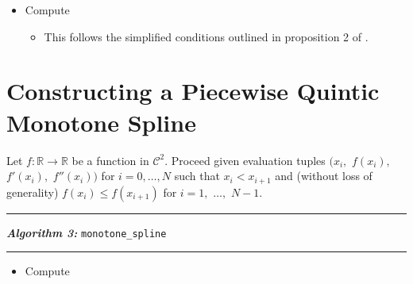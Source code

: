 \documentclass{article}
\begin{document}
\begin{itemize}
  \itemsep0pt
  \parskip0pt

\item Compute

  \begin{itemize}
    \item[] This follows the simplified conditions outlined in proposition 2 of \cite{schmidt1988positivity}.
  \end{itemize}

\end{itemize}


\section{Constructing a Piecewise Quintic Monotone Spline}
\label{monotone_spline}

Let $f: \mathbb{R} \rightarrow \mathbb{R}$ be a function in $\mathcal{C}^2.$ Proceed given evaluation tuples $\big(x_i,$ $f(x_i),$ $f'(x_i),$ $f''(x_i)\big)$ for $i = 0,\ldots,N$ such that $x_i < x_{i+1}$ and (without loss of generality) $f(x_i) \leq f(x_{i+1})$ for $i = 1,$ $\ldots,$ $N-1$. 

\vspace{10pt}
\hrule
\vspace{3pt}
\noindent\textbf{\textit{Algorithm 3:}} \texttt{monotone\_spline}
\vspace{3pt}
\hrule

\begin{itemize}
  \itemsep0pt
  \parskip0pt

\item Compute
\end{itemize}






\end{document}

